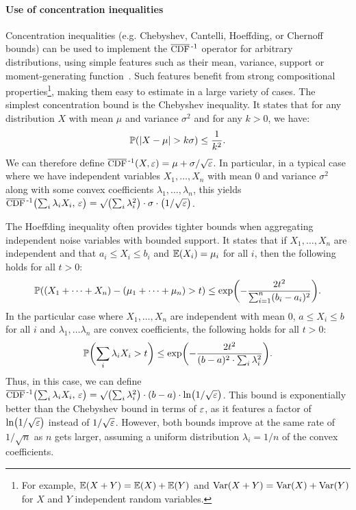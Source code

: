 \documentclass[acmsmall,screen,nonacm]{acmart}
\begin{document}
\paragraph{Use of concentration inequalities} Concentration inequalities (e.g. Chebyshev, Cantelli, Hoeffding, or Chernoff bounds) can be used to implement the $\InvCCDF$ operator for arbitrary distributions, using simple features such as their mean, variance, support or moment-generating function~\cite{bertsekas2008introduction}. Such features benefit from strong compositional properties\footnote{For example, $\mathbb{E}(X + Y) = \mathbb{E}(X) + \mathbb{E}(Y)$ and $\operatorname{\text{Var}}(X + Y) = \operatorname{\text{Var}}(X) + \operatorname{\text{Var}}(Y)$ for $X$ and $Y$ independent random variables.}, making them easy to estimate in a large variety of cases. The simplest concentration bound is the Chebyshev inequality. It states that for any distribution $X$ with mean $\mu$ and variance $\sigma^2$ and for any $k > 0$, we have: \[\mathbb{P}(|X-\mu| > k \sigma) \le \frac{1}{k^2}. \]
We can therefore define $\InvCCDF(X, \Eps) = \mu + \sigma / \sqrt{\Eps}$. In particular, in a typical case where we have independent variables $X_1,\dots,X_n$ with mean $0$ and variance $\sigma^2$ along with some convex coefficients $\lambda_1,\dots,\lambda_n$,
this yields $\InvCCDF\bigl(\sum_i \lambda_i X_i, \, \Eps\bigr) = \SqrtI{\sum_i \lambda_i^2} \cdot \sigma \cdot \bigl(1/\sqrt{\Eps}\bigr)$.

The Hoeffding inequality often provides tighter bounds when aggregating independent noise variables with bounded support. It states that if $X_1, \dots, X_n$ are independent and that $a_i \le X_i \le b_i$ and $\mathbb{E}(X_i) = \mu_i$ for all $i$, then the following holds for all $t > 0$:
\[ \mathbb{P}((X_1+\dots+X_n) - (\mu_1 + \dots + \mu_n) > t) \le \exp\biggl(-\frac{2t^2}{\sum_{i=1}^n(b_i-a_i)^2}\biggr). \] In the particular case where $X_1, \dots, X_n$ are independent with mean $0$, $a \le X_i \le b$ for all $i$ and $\lambda_1,\dots\lambda_n$ are convex coefficients, the following holds for all $t>0$: \[\mathbb{P}\biggl(\sum_i\lambda_iX_i > t\biggr) \le \exp\biggl(-\frac{2t^2}{(b-a)^2 \cdot \sum_i \lambda_i^2}\biggr).\] Thus, in this case, we can define $\InvCCDF\bigl(\sum_i \lambda_i X_i, \, \Eps\bigr) = \SqrtI{\sum_i \lambda_i^2} \cdot (b-a) \cdot \ln \bigl(1/\sqrt{\Eps}\bigr)$. This bound is exponentially better than the Chebyshev bound in terms of $\varepsilon$, as it features a factor of $\ln \bigl(1/\sqrt{\varepsilon}\bigr)$ instead of $1/\sqrt{\varepsilon}$. However, both bounds improve at the same rate of $1/\sqrt{n}$ as $n$ gets larger, assuming a uniform distribution $\lambda_i=1/n$ of the convex coefficients.
\end{document}
